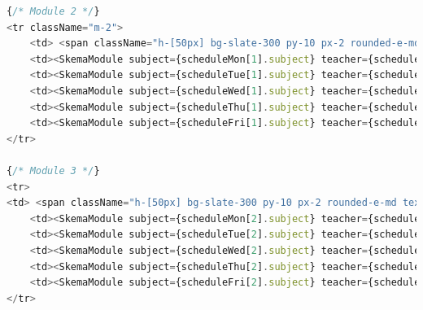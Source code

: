 \documentclass[12pt, a4paper]{article}
\begin{document}
\begin{appendices}
\begin{lstlisting}[language=Javascript]
{/* Module 2 */}
<tr className="m-2">
    <td> <span className="h-[50px] bg-slate-300 py-10 px-2 rounded-e-md text-slate-600 font-bold">2.</span> </td>
    <td><SkemaModule subject={scheduleMon[1].subject} teacher={scheduleMon[1].teacher} room={scheduleMon[1].room} visibility={scheduleMon[1].visibility} note={scheduleMon[1].note} homework={scheduleMon[1].homework} id={scheduleMon[1].id} /></td>
    <td><SkemaModule subject={scheduleTue[1].subject} teacher={scheduleTue[1].teacher} room={scheduleTue[1].room} visibility={scheduleTue[1].visibility} note={scheduleTue[1].note} homework={scheduleTue[1].homework} id={scheduleTue[1].id} /></td>
    <td><SkemaModule subject={scheduleWed[1].subject} teacher={scheduleWed[1].teacher} room={scheduleWed[1].room} visibility={scheduleWed[1].visibility} note={scheduleWed[1].note} homework={scheduleWed[1].homework} id={scheduleWed[1].id} /></td>
    <td><SkemaModule subject={scheduleThu[1].subject} teacher={scheduleThu[1].teacher} room={scheduleThu[1].room} visibility={scheduleThu[1].visibility} note={scheduleThu[1].note} homework={scheduleThu[1].homework} id={scheduleThu[1].id} /></td>
    <td><SkemaModule subject={scheduleFri[1].subject} teacher={scheduleFri[1].teacher} room={scheduleFri[1].room} visibility={scheduleFri[1].visibility} note={scheduleFri[1].note} homework={scheduleFri[1].homework} id={scheduleFri[1].id} /></td>
</tr>

{/* Module 3 */}
<tr>
<td> <span className="h-[50px] bg-slate-300 py-10 px-2 rounded-e-md text-slate-600 font-bold">3.</span> </td>
    <td><SkemaModule subject={scheduleMon[2].subject} teacher={scheduleMon[2].teacher} room={scheduleMon[2].room} visibility={scheduleMon[2].visibility} note={scheduleMon[2].note} homework={scheduleMon[2].homework} id={scheduleMon[2].id} /></td>
    <td><SkemaModule subject={scheduleTue[2].subject} teacher={scheduleTue[2].teacher} room={scheduleTue[2].room} visibility={scheduleTue[2].visibility} note={scheduleTue[2].note} homework={scheduleTue[2].homework} id={scheduleTue[2].id} /></td>
    <td><SkemaModule subject={scheduleWed[2].subject} teacher={scheduleWed[2].teacher} room={scheduleWed[2].room} visibility={scheduleWed[2].visibility} note={scheduleWed[2].note} homework={scheduleWed[2].homework} id={scheduleWed[2].id} /></td>
    <td><SkemaModule subject={scheduleThu[2].subject} teacher={scheduleThu[2].teacher} room={scheduleThu[2].room} visibility={scheduleThu[2].visibility} note={scheduleThu[2].note} homework={scheduleThu[2].homework} id={scheduleThu[2].id} /></td>
    <td><SkemaModule subject={scheduleFri[2].subject} teacher={scheduleFri[2].teacher} room={scheduleFri[2].room} visibility={scheduleFri[2].visibility} note={scheduleFri[2].note} homework={scheduleFri[2].homework} id={scheduleFri[2].id} /></td>
</tr>


\end{lstlisting}
\end{appendices}
\end{document}
